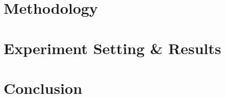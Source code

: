 \documentclass[sigconf,nonacm]{acmart}
\begin{document}
% 

\section{Methodology}


\section{Experiment Setting \& Results}


\section{Conclusion}


\begin{acks}

\end{acks}

\clearpage
\balance


\end{document}
